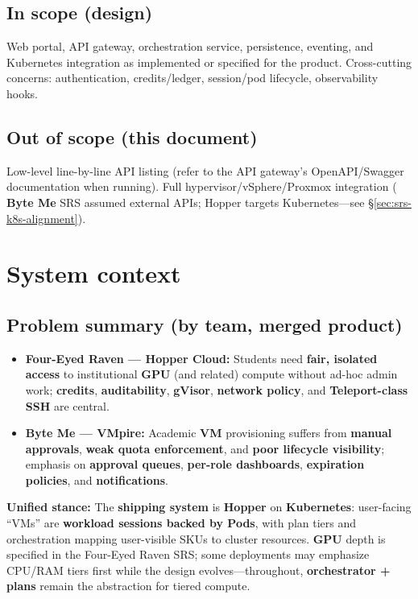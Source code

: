 \documentclass[12pt,a4paper]{article}
\newcommand{\ByteMeHeading}{Byte Me}
\newcommand{\ByteMe}{%
  \texorpdfstring{\textbf{\ByteMeHeading}}{Byte Me}%
}
\begin{document}
\subsection{In scope (design)}
Web portal, API gateway, orchestration service, persistence, eventing, and Kubernetes integration as implemented or specified for the product. Cross-cutting concerns: authentication, credits/ledger, session/pod lifecycle, observability hooks.

\subsection{Out of scope (this document)}
Low-level line-by-line API listing (refer to the API gateway's OpenAPI/Swagger documentation when running). Full hypervisor/vSphere/Proxmox integration (\ByteMe{} SRS assumed external APIs; Hopper targets Kubernetes---see \S\ref{sec:srs-k8s-alignment}).

\section{System context}
\label{sec:context}

\subsection{Problem summary (by team, merged product)}
\begin{itemize}[leftmargin=*]
  \item \textbf{Four-Eyed Raven --- Hopper Cloud:} Students need \textbf{fair, isolated access} to institutional \textbf{GPU} (and related) compute without ad-hoc admin work; \textbf{credits}, \textbf{auditability}, \textbf{gVisor}, \textbf{network policy}, and \textbf{Teleport-class SSH} are central.
  \item \textbf{\ByteMe{} --- VMpire:} Academic \textbf{VM} provisioning suffers from \textbf{manual approvals}, \textbf{weak quota enforcement}, and \textbf{poor lifecycle visibility}; emphasis on \textbf{approval queues}, \textbf{per-role dashboards}, \textbf{expiration policies}, and \textbf{notifications}.
\end{itemize}

\textbf{Unified stance:} The \textbf{shipping system} is \textbf{Hopper} on \textbf{Kubernetes}: user-facing ``VMs'' are \textbf{workload sessions backed by Pods}, with plan tiers and orchestration mapping user-visible SKUs to cluster resources. \textbf{GPU} depth is specified in the Four-Eyed Raven SRS; some deployments may emphasize CPU/RAM tiers first while the design evolves---throughout, \textbf{orchestrator + plans} remain the abstraction for tiered compute.
\end{document}
